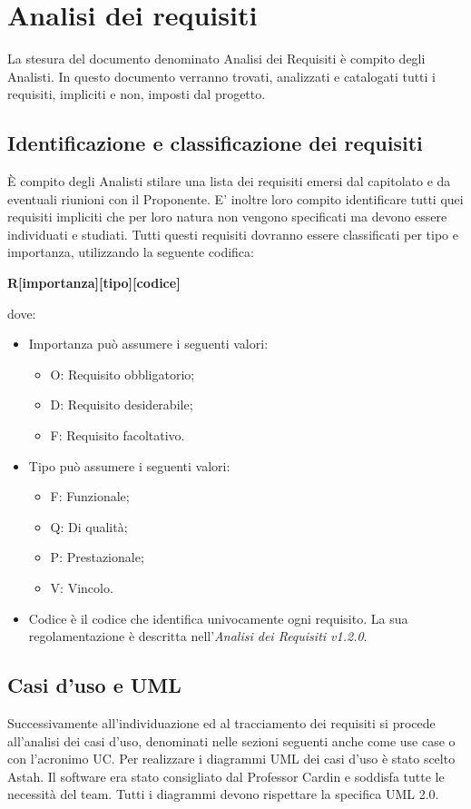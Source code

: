 \newpage
\section{Analisi dei requisiti}
\label{7.0}
La stesura del documento denominato Analisi dei Requisiti è compito degli Analisti. 
In questo documento verranno trovati, analizzati e catalogati tutti i requisiti, impliciti e non, imposti dal progetto.

\subsection{Identificazione e classificazione dei requisiti}
\label{7.1}
È compito degli Analisti stilare una lista dei requisiti emersi dal capitolato e da eventuali riunioni con il Proponente. E' inoltre loro compito identificare tutti quei requisiti impliciti che per loro natura non vengono specificati ma devono essere individuati e studiati. Tutti questi requisiti dovranno essere classificati per tipo e importanza, utilizzando la seguente codifica:
\begin{center}
\textbf{R[importanza][tipo][codice]}
\end{center}
dove:
\begin{itemize}
\item Importanza può assumere i seguenti valori:
	\begin{itemize}
	\item O: Requisito obbligatorio;
	\item D: Requisito desiderabile;
	\item F: Requisito facoltativo.
	\end{itemize}
\item Tipo può assumere i seguenti valori:
	\begin{itemize}
	\item F: Funzionale;
	\item Q: Di qualità;
	\item P: Prestazionale;
	\item V: Vincolo.
	\end{itemize}
\item Codice è il codice che identifica univocamente ogni requisito. La sua regolamentazione è descritta nell'\emph{Analisi dei Requisiti v1.2.0}.
\end{itemize}

\subsection{Casi d’uso e UML}
\label{7.2}
Successivamente all'individuazione ed al tracciamento dei requisiti si procede all'analisi dei casi d'uso, denominati nelle sezioni seguenti anche come use case o con l'acronimo UC.
Per realizzare i diagrammi UML dei casi d'uso è stato scelto Astah. Il software era stato consigliato dal Professor Cardin e soddisfa tutte le necessità del team.
Tutti i diagrammi devono rispettare la specifica UML 2.0.

